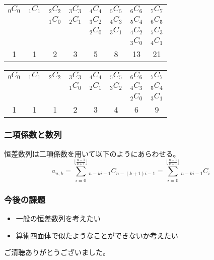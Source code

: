 \documentclass[dvipdfmx,12pt]{beamer}
\begin{document}
\begin{frame}
\begin{table}[htb]
\begin{tabular}{cccccccc}
${_0C_0}$&${_1C_1}$&${_2C_2}$&${_3C_3}$&${_4C_4}$&${_5C_5}$&${_6C_6}$&${_7C_7}$\\
&&${_1C_0}$&${_2C_1}$&${_3C_2}$&${_4C_3}$&${_5C_4}$&${_6C_5}$\\
&&&&${_2C_0}$&${_3C_1}$&${_4C_2}$&${_5C_3}$\\
&&&&&&${_3C_0}$&${_4C_1}$\\ \hline
1&1&2&3&5&8&13&21
\end{tabular}
\end{table}
\end{frame}

\begin{frame}
\begin{table}[htb]
\begin{tabular}{cccccccc}
${_0C_0}$&${_1C_1}$&${_2C_2}$&${_3C_3}$&${_4C_4}$&${_5C_5}$&${_6C_6}$&${_7C_7}$\\
&&&${_1C_0}$&${_2C_1}$&${_3C_2}$&${_4C_3}$&${_5C_4}$\\
&&&&&&${_2C_0}$&${_3C_1}$\\ \hline
1&1&1&2&3&4&6&9
\end{tabular}
\end{table}
\end{frame}


\begin{frame}
\frametitle{二項係数と数列}
\begin{theorem}
恒差数列は二項係数を用いて以下のようにあらわせる。
$$
a_{n,k}=\sum_{i=0}^{\lfloor \frac{n-1}{k+1}\rfloor}{_{n-ki-1}C_{n-(k+1)i-1}}=\sum_{i=0}^{\lfloor \frac{n-1}{k+1}\rfloor}{_{n-ki-1}C_{i}}
$$
\end{theorem}
\end{frame}

\begin{frame}
\frametitle{今後の課題}
\begin{itemize}
\item 一般の恒差数列を考えたい
\item 算術四面体で似たようなことができないか考えたい
\end{itemize}
\end{frame}

\begin{frame}
ご清聴ありがとうございました。
\end{frame}
\end{document}
